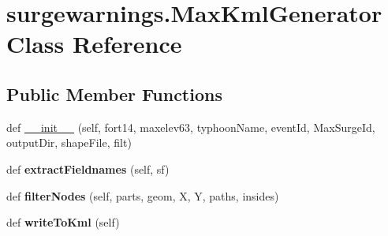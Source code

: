 \hypertarget{classsurgewarnings_1_1_max_kml_generator}{}\section{surgewarnings.\+Max\+Kml\+Generator Class Reference}
\label{classsurgewarnings_1_1_max_kml_generator}
\subsection*{Public Member Functions}
\begin{DoxyCompactItemize}
\item 
def \hyperlink{classsurgewarnings_1_1_max_kml_generator_acde57ffb3d3546bfe062ed20e5b431f8}{\+\_\+\+\_\+init\+\_\+\+\_\+} (self, fort14, maxelev63, typhoon\+Name, event\+Id, Max\+Surge\+Id, output\+Dir, shape\+File, filt)
\item 
\hypertarget{classsurgewarnings_1_1_max_kml_generator_aa2899674f37f5c783f4cb9b820ab2a1a}{}def {\bfseries extract\+Fieldnames} (self, sf)\label{classsurgewarnings_1_1_max_kml_generator_aa2899674f37f5c783f4cb9b820ab2a1a}

\item 
\hypertarget{classsurgewarnings_1_1_max_kml_generator_a3a3f01432a3e16dea9265078a3aa435d}{}def {\bfseries filter\+Nodes} (self, parts, geom, X, Y, paths, insides)\label{classsurgewarnings_1_1_max_kml_generator_a3a3f01432a3e16dea9265078a3aa435d}

\item 
\hypertarget{classsurgewarnings_1_1_max_kml_generator_abb06764ec2b0a04cb404eca18cf6c89c}{}def {\bfseries write\+To\+Kml} (self)\label{classsurgewarnings_1_1_max_kml_generator_abb06764ec2b0a04cb404eca18cf6c89c}

\end{DoxyCompactItemize}
